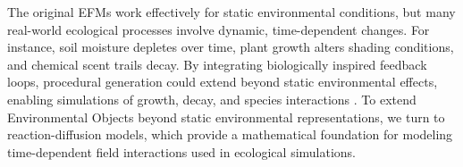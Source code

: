 The original EFMs work effectively for static environmental conditions, but many real-world ecological processes involve dynamic, time-dependent changes. For instance, soil moisture depletes over time, plant growth alters shading conditions, and chemical scent trails decay. By integrating biologically inspired feedback loops, procedural generation could extend beyond static environmental effects, enabling simulations of growth, decay, and species interactions \cite{Okubo2001,Wojtek2022}. To extend Environmental Objects beyond static environmental representations, we turn to reaction-diffusion models, which provide a mathematical foundation for modeling time-dependent field interactions used in ecological simulations. 























